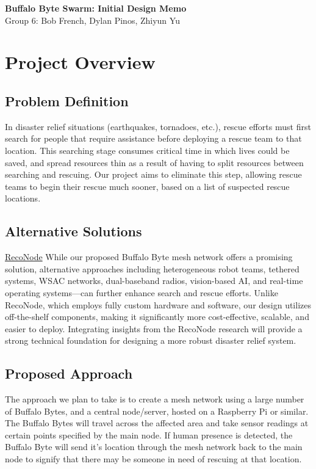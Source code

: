 \documentclass[10pt]{article}
\begin{document}
\begin{center}
	\Large\textbf{Buffalo Byte Swarm: Initial Design Memo}\\[0.1in]
	\large Group 6: Bob French, Dylan Pinos, Zhiyun Yu
\end{center}

\section*{Project Overview}
\subsection*{Problem Definition}
In disaster relief situations (earthquakes, tornadoes, etc.), rescue efforts must first search for people that require assistance before deploying a rescue team to that location. This searching stage consumes critical time in which lives could be saved, and spread resources thin as a result of having to split resources between searching and rescuing. Our project aims to eliminate this step, allowing rescue teams to begin their rescue much sooner, based on a list of suspected rescue locations.
\subsection*{Alternative Solutions}
\underline{RecoNode} \cite{5981569}
While our proposed Buffalo Byte mesh network offers a promising solution, alternative approaches including heterogeneous robot teams, tethered systems, WSAC networks, dual-baseband radios, vision-based AI, and real-time operating systems—can further enhance search and rescue efforts. Unlike RecoNode, which employs fully custom hardware and software, our design utilizes off-the-shelf components, making it significantly more cost-effective, scalable, and easier to deploy. Integrating insights from the RecoNode research will provide a strong technical foundation for designing a more robust disaster relief system.
\subsection*{Proposed Approach}
The approach we plan to take is to create a mesh network using a large number of Buffalo Bytes, and a central node/server, hosted on a Raspberry Pi or similar. The Buffalo Bytes will travel across the affected area and take sensor readings at certain points specified by the main node. If human presence is detected, the Buffalo Byte will send it's location through the mesh network back to the main node to signify that there may be someone in need of rescuing at that location.
\end{document}
